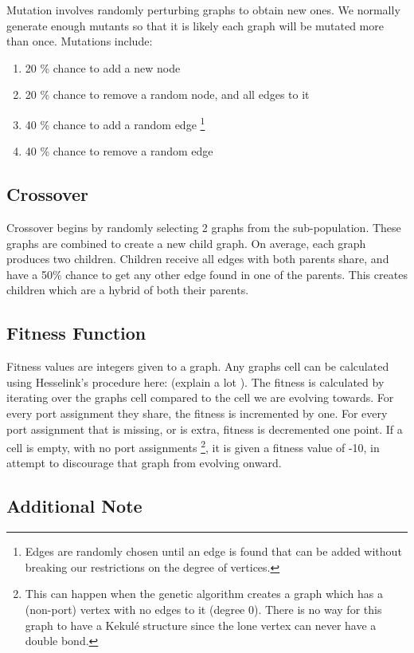\documentclass[12pt]{article}
\begin{document}
Mutation involves randomly perturbing graphs to obtain new ones. We normally  generate enough mutants so that it is likely each graph will be mutated more than once. Mutations include:
\begin{enumerate}
\item 20 \% chance to add a new node
\item 20 \%  chance to remove a random node, and all edges to it
\item 40 \% chance to add a random edge \footnote{ Edges are randomly chosen until an edge is found that can be added without breaking our restrictions on the degree of vertices.}
\item 40 \% chance to remove a random edge
\end{enumerate}

\subsection{Crossover}

Crossover begins by randomly selecting 2 graphs from the sub-population. These graphs are combined to create a new child graph. On average, each graph produces two children. Children receive all edges with both parents share, and have a 50\% chance to get any other edge found in one of the parents. This creates children which are a hybrid of both their parents.

\subsection{Fitness Function}

Fitness values are integers given to a graph. Any graphs cell can be calculated using Hesselink's procedure here: (explain a lot ). The fitness is calculated by iterating over the graphs cell compared to the cell we are evolving towards. For every port assignment they share, the fitness is incremented by one. For every port assignment that is missing, or is extra, fitness is decremented one point. If a cell is empty, with no port assignments \footnote{This can happen when the genetic algorithm creates a graph which has a (non-port) vertex with no edges to it (degree 0). There is no way for this graph to have a Kekul\'e structure since the lone vertex can never have a double bond.}, it is given a fitness value of -10, in attempt to discourage that graph from evolving onward. 

\subsection{Additional Note}
\end{document}
